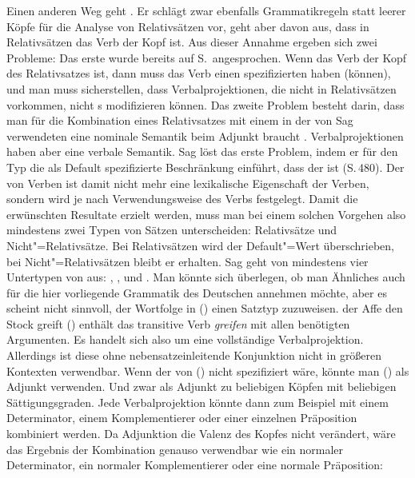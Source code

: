 Einen anderen Weg geht \citet{Sag97a}. Er schlägt zwar ebenfalls Grammatikregeln statt leerer Köpfe
für die Analyse von Relativsätzen vor, geht aber davon aus, dass in Relativsätzen das Verb der Kopf
ist. Aus dieser Annahme ergeben sich zwei Probleme: Das erste wurde bereits auf
S.\,\pageref{Erklaerung-relativizer} angesprochen. Wenn das Verb der Kopf des Relativsatzes ist,
dann muss das Verb einen spezifizierten \modw haben (können), und man muss sicherstellen, dass
Verbalprojektionen, die nicht in Relativsätzen vorkommen, nicht \nbar{}s modifizieren können. Das
zweite Problem besteht darin, dass man für die Kombination eines Relativsatzes mit einem \nbar in
der von Sag verwendeten  eine nominale Semantik beim Adjunkt
braucht \parencites[Abschnitt~1.9, 213]{ps2}. Verbalprojektionen haben aber eine verbale Semantik. Sag löst das erste 
Problem, indem er für den Typ  die als Default spezifizierte Beschränkung
einführt, dass der \modw {} ist (S.\,480). Der \modw von Verben ist damit nicht mehr eine
lexikalische Eigenschaft der Verben, sondern wird je nach Verwendungsweise des Verbs
festgelegt. Damit die erwünschten Resultate erzielt werden, muss man bei einem solchen Vorgehen also
mindestens zwei Typen von Sätzen unterscheiden: Relativsätze und Nicht"=Relativsätze. Bei
Relativsätzen wird der Default"=Wert überschrieben, bei Nicht"=Relativsätzen bleibt er erhalten. Sag geht von
mindestens vier Untertypen von  aus: , ,  und
. Man könnte sich überlegen, ob man Ähnliches auch für die hier vorliegende Grammatik
des Deutschen annehmen möchte, aber es scheint nicht sinnvoll, der Wortfolge in () einen
Satztyp zuzuweisen.
\ea
der Affe den Stock greift
\z
\largerpage
() enthält das transitive Verb \emph{greifen} mit allen benötigten Argumenten. Es handelt
sich also um eine vollständige Verbalprojektion. Allerdings ist diese ohne nebensatzeinleitende
Konjunktion nicht in größeren Kontexten verwendbar. Wenn der \modw von () nicht spezifiziert
wäre, könnte man () als Adjunkt verwenden. Und zwar als Adjunkt zu beliebigen Köpfen mit beliebigen
Sättigungsgraden. Jede Verbalprojektion könnte dann zum Beispiel mit einem Determinator, einem Komplementierer oder einer einzelnen Präposition kombiniert werden. Da Adjunktion die Valenz des Kopfes nicht verändert, wäre das Ergebnis der Kombination genauso verwendbar wie ein normaler Determinator, ein normaler Komplementierer oder eine normale Präposition:
\eal
{}
